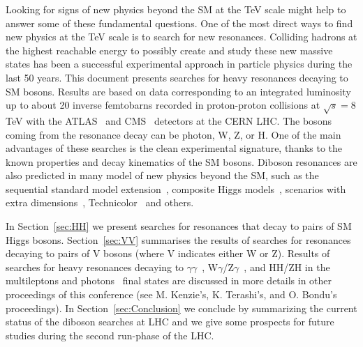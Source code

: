 \documentclass[3p,times,twocolumn]{elsarticle}
\begin{document}
Looking for signs of new physics beyond the SM at the TeV scale might
help to answer some of these fundamental questions. One of the most
direct ways to find new physics at the TeV scale is to search for new resonances.
Colliding hadrons at the highest reachable energy to possibly create 
and study these new massive states has been a successful experimental
approach in particle physics during the last 50 years. 
This document presents searches for heavy resonances decaying to SM
bosons. Results are based on data corresponding to an integrated luminosity
up to about 20 inverse femtobarns recorded in proton-proton collisions at
$\sqrt{s} = 8$ TeV with the ATLAS~\cite{1748-0221-3-08-S08003} 
and CMS~\cite{Chatrchyan:2008aa} detectors at the CERN LHC. 
The bosons coming from the resonance decay can be photon, W, Z, or H. 
One of the main advantages of these searches is the clean 
experimental signature, thanks to the known properties
and decay kinematics of the SM bosons. Diboson resonances
are also predicted in many model of new physics beyond the SM, such as
the sequential standard model extension~\cite{Altarelli:1989ff},
composite Higgs
models~\cite{Kaplan:1983fs,Contino:2006nn,Giudice:2007fh}, 
scenarios with extra 
dimensions~\cite{Randall:1999ee,Agashe:2007zd,Fitzpatrick:2007qr,Antipin:2007pi}, 
Technicolor~\cite{Susskind:1978ms,Lane:1999uh,Eichten:2007sx} and others.

In Section~\ref{sec:HH} we present searches for resonances that decay to
pairs of SM Higgs bosons. Section~\ref{sec:VV} summarises the results of
searches for resonances decaying to pairs of V bosons (where V
indicates either W or Z). 
Results of searches for heavy resonances decaying to 
$\gamma\gamma$~\cite{CMS:2014onr}, W$\gamma$/Z$\gamma$~\cite{Aad:2014fha}, and 
 HH/ZH in the multileptons and photons~\cite{Khachatryan:2014jya} final states 
are discussed in more details in other proceedings of this conference
(see M. Kenzie's, K. Terashi's, and O. Bondu’s proceedings).
In Section~\ref{sec:Conclusion} we conclude by summarizing the current status of the
diboson searches at LHC and we give some prospects for future studies
during the second run-phase of the LHC.
\end{document}
